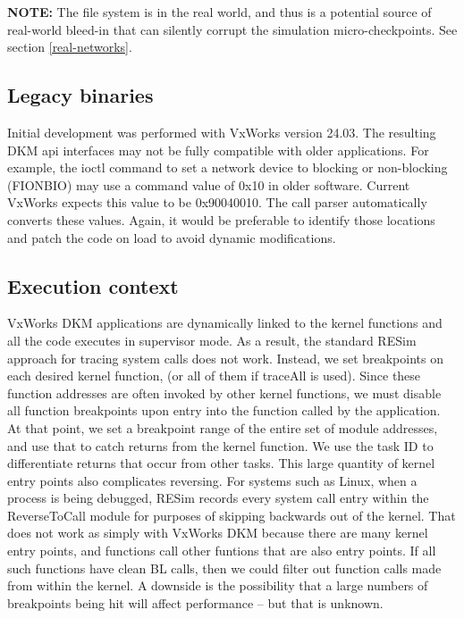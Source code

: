 \documentclass[titlepage]{article}
\begin{document}
\begin{appendices}
\textbf{NOTE:} The file system is in the real world, and thus is a potential source of real-world bleed-in that can silently corrupt the simulation micro-checkpoints.
See section \ref{real-networks}.

\subsection {Legacy binaries}
Initial development was performed with VxWorks version 24.03.  The resulting DKM api interfaces may not be fully compatible with older applications.  For example, the
ioctl command to set a network device to blocking or non-blocking (FIONBIO) may use a command value of 0x10 in older software.  Current VxWorks expects this value to be 0x90040010.
The call parser automatically converts these values.  Again, it would be preferable to identify those locations and patch the code on load to avoid dynamic modifications.

\subsection{Execution context}
VxWorks DKM applications are dynamically linked to the kernel functions and all the code executes in supervisor mode.  As a result, the standard RESim approach for tracing system
calls does not work.  Instead, we set breakpoints on each desired kernel function, (or all of them if traceAll is used).  Since these function addresses are often invoked by other
kernel functions, we must disable all function breakpoints upon entry into the function called by the application.  At that point, we set a breakpoint range of 
the entire set of module addresses, and use that to catch returns from the kernel function.  We use the task ID to differentiate returns that occur from other tasks.
This large quantity of kernel entry points also complicates reversing.  For systems such as Linux, when a process is being debugged, RESim records every system call 
entry within the ReverseToCall module for purposes of skipping backwards out of the kernel. That does not work as simply with VxWorks DKM because there are 
many kernel entry points, and functions call other funtions that are also entry points.  If all such functions have clean BL calls, then we could filter out function
calls made from within the kernel.  A downside is the possibility that a large numbers of breakpoints being hit will affect performance -- but that is unknown.


\end{appendices}
\end{document}
